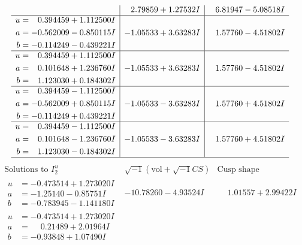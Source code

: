 \documentclass[1p]{elsarticle_modified}
\theoremstyle{definition}
\newcommand{\I}{\sqrt{-1}}
\begin{document}
$$\begin{array}{c|c|c}
 & \phantom{-}2.79859 + 1.27532 I & \phantom{-}6.81947 - 5.08518 I \\ \hline\begin{aligned}
u &= \phantom{-}0.394459 + 1.112500 I \\
a &= -0.562009 - 0.850115 I \\
b &= -0.114249 - 0.439221 I\end{aligned}
 & -1.05533 + 3.63283 I & \phantom{-}1.57760 - 4.51802 I \\ \hline\begin{aligned}
u &= \phantom{-}0.394459 + 1.112500 I \\
a &= \phantom{-}0.101648 + 1.236760 I \\
b &= \phantom{-}1.123030 + 0.184302 I\end{aligned}
 & -1.05533 + 3.63283 I & \phantom{-}1.57760 - 4.51802 I \\ \hline\begin{aligned}
u &= \phantom{-}0.394459 - 1.112500 I \\
a &= -0.562009 + 0.850115 I \\
b &= -0.114249 + 0.439221 I\end{aligned}
 & -1.05533 - 3.63283 I & \phantom{-}1.57760 + 4.51802 I \\ \hline\begin{aligned}
u &= \phantom{-}0.394459 - 1.112500 I \\
a &= \phantom{-}0.101648 - 1.236760 I \\
b &= \phantom{-}1.123030 - 0.184302 I\end{aligned}
 & -1.05533 - 3.63283 I & \phantom{-}1.57760 + 4.51802 I\\
 \hline 
 \end{array}$$\newpage$$\begin{array}{c|c|c}  
\text{Solutions to }I^u_{2}& \I (\text{vol} + \sqrt{-1}CS) & \text{Cusp shape}\\
 \hline 
\begin{aligned}
u &= -0.473514 + 1.273020 I \\
a &= -1.25140 - 0.85751 I \\
b &= -0.783945 - 1.141180 I\end{aligned}
 & -10.78260 - 4.93524 I & \phantom{-}1.01557 + 2.99422 I \\ \hline\begin{aligned}
u &= -0.473514 + 1.273020 I \\
a &= \phantom{-}0.21489 + 2.01964 I \\
b &= -0.93848 + 1.07490 I\end{aligned}

\end{array}$$
\end{document}
